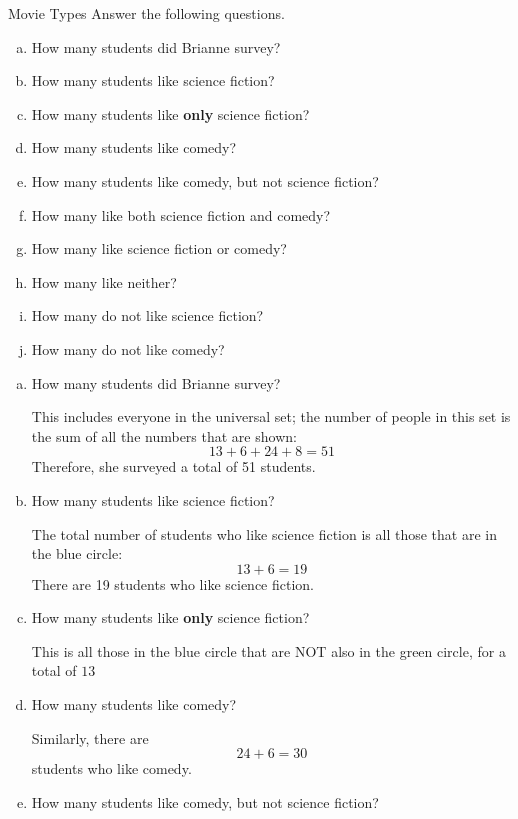 \begin{example}{Movie Types}
Answer the following questions.
\begin{enumerate}[(a)]
\item How many students did Brianne survey?
\item How many students like science fiction?
\item How many students like \textbf{only} science fiction?
\item How many students like comedy?
\item How many students like comedy, but not science fiction?
\item How many like both science fiction and comedy?
\item How many like science fiction or comedy?
\item How many like neither?
\item How many do not like science fiction?
\item How many do not like comedy?
\end{enumerate}

\sol
\begin{enumerate}[(a)]
\item How many students did Brianne survey?

This includes everyone in the universal set; the number of people in this set is the sum of all the numbers that are shown:
\[13+6+24+8 = \boxed{51}\]
Therefore, she surveyed a total of 51 students.\\

\item How many students like science fiction?

The total number of students who like science fiction is all those that are in the blue circle:
\[13+6 = \boxed{19}\]
There are 19 students who like science fiction.\\

\item How many students like \textbf{only} science fiction?

This is all those in the blue circle that are NOT also in the green circle, for a total of $\boxed{13}$\\

\item How many students like comedy?

Similarly, there are \[24+6 = \boxed{30}\] students who like comedy.\\

\item How many students like comedy, but not science fiction?


\end{enumerate}
\end{example}

